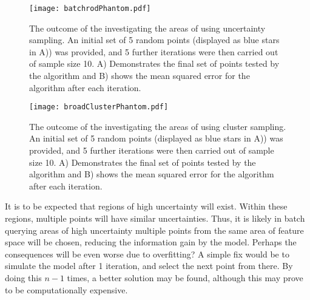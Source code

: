 \begin{figure}[H]
    \begin{center}
        \texttt{[image: batchrodPhantom.pdf]}
        \caption[Batch Uncertainty Sampling]{The outcome of the investigating the areas of using uncertainty sampling. An initial set of 5 random points (displayed as blue stars in A)) was provided, and 5 further iterations were then carried out of sample size 10. A) Demonstrates the final set of points tested by the algorithm and B) shows the mean squared error for the algorithm after each iteration.}
        \label{fig:broadrod}
    \end{center}
\end{figure}


\begin{figure}[H]
    \begin{center}
        \texttt{[image: broadClusterPhantom.pdf]}
        \caption[Batch Cluster Sampling]{The outcome of the investigating the areas of using cluster sampling. An initial set of 5 random points (displayed as blue stars in A)) was provided, and 5 further iterations were then carried out of sample size 10. A) Demonstrates the final set of points tested by the algorithm and B) shows the mean squared error for the algorithm after each iteration.}
        \label{fig:batchCluster}
    \end{center}
\end{figure}


It is to be expected that regions of high uncertainty will exist. Within these regions, multiple points will have similar uncertainties. Thus, it is likely in batch querying areas of high uncertainty multiple points from the same area of feature space will be chosen, reducing the information gain by the model. Perhaps the consequences will be even worse due to overfitting? A simple fix would be to simulate the model after 1 iteration, and select the next point from there. By doing this $n-1$ times, a better solution may be found, although this may prove to be computationally expensive.

